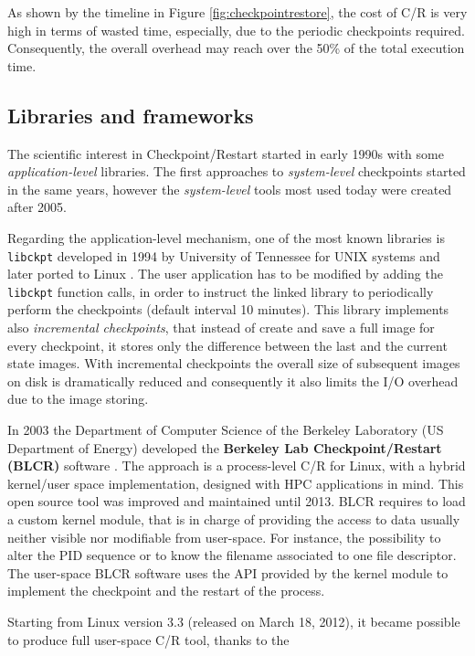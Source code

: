 As shown by the timeline in Figure \ref{fig:checkpointrestore}, the cost of
C/R is very high in terms of wasted time, especially, due to the periodic
checkpoints required. Consequently, the overall overhead may reach over the
50\% \cite{fiala2012detection} of the total execution time.


\subsection{Libraries and frameworks}
The scientific interest in Checkpoint/Restart started in early 1990s with
some \emph{application-level} libraries. The first approaches to
\emph{system-level} checkpoints \linebreak started in the same years, however the
\emph{system-level} tools most used today were created after 2005.

Regarding the application-level mechanism, one of the most known libraries is
\texttt{libckpt} developed in 1994 by University of Tennessee for UNIX systems
and later ported to Linux \cite{plank1994libckpt}.
The user application has to be modified by adding the \texttt{libckpt}
function calls, in order to instruct the linked library to periodically
perform the checkpoints (default interval 10 minutes).
This library implements also \emph{incremental checkpoints}, that instead
of create and save a full image for every checkpoint, it stores only the
difference between the last and the current state images. With incremental
checkpoints the overall size of subsequent images on disk is dramatically
reduced and consequently it also limits the I/O overhead due to the image
storing.

In 2003 the Department of Computer Science of the Berkeley Laboratory (US
Department of Energy) developed the \textbf{Berkeley Lab Checkpoint/Restart
(BLCR)} software \cite{hargrove2006berkeley}. The approach is a process-level
C/R for Linux, with a hybrid kernel/user space implementation, designed with
HPC applications in mind. This open source tool was improved and maintained
until 2013. BLCR requires to load a custom kernel module, that is in charge of
providing the access to data usually neither visible nor modifiable from
user-space.
For instance, the possibility to alter the PID sequence or to know the filename
associated to one file descriptor. The user-space BLCR software uses the API
provided by the kernel module to implement the checkpoint and the restart
of the process.

Starting from Linux version 3.3 (released on March 18, 2012), it became
possible to produce full user-space C/R tool, thanks to the

